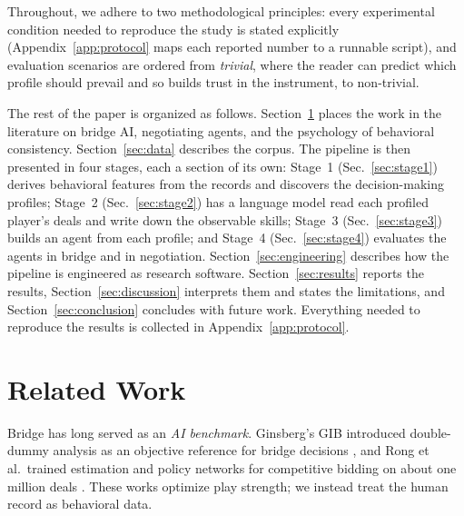 \documentclass[11pt,a4paper]{article}
\begin{document}
Throughout, we adhere to two methodological principles: every
experimental condition needed to reproduce the study is stated
explicitly (Appendix~\ref{app:protocol} maps each reported number to a
runnable script), and evaluation scenarios are ordered from
\emph{trivial}, where the reader can predict which profile should
prevail and so builds trust in the instrument, to non-trivial.

The rest of the paper is organized as follows.
Section~\ref{sec:related} places the work in the literature on bridge
AI, negotiating agents, and the psychology of behavioral consistency.
Section~\ref{sec:data} describes the corpus. The pipeline is then
presented in four stages, each a section of its own: Stage~1
(Sec.~\ref{sec:stage1}) derives behavioral features from the records
and discovers the decision-making profiles; Stage~2
(Sec.~\ref{sec:stage2}) has a language model read each profiled
player's deals and write down the observable skills; Stage~3
(Sec.~\ref{sec:stage3}) builds an agent from each profile; and Stage~4
(Sec.~\ref{sec:stage4}) evaluates the agents in bridge and in
negotiation. Section~\ref{sec:engineering} describes how the pipeline
is engineered as research software. Section~\ref{sec:results} reports
the results, Section~\ref{sec:discussion} interprets them and states
the limitations, and Section~\ref{sec:conclusion} concludes with future
work. Everything needed to reproduce the results is collected in
Appendix~\ref{app:protocol}.

\section{Related Work}\label{sec:related}

Bridge has long served as an \emph{AI benchmark}. Ginsberg's GIB
introduced double-dummy analysis as an objective reference for bridge
decisions \cite{ginsberg2001gib}, and Rong et al.\ trained estimation
and policy networks for competitive bidding on about one million deals
\cite{rong2019bridge}. These works optimize play strength; we instead
treat the human record as behavioral data.
\end{document}
